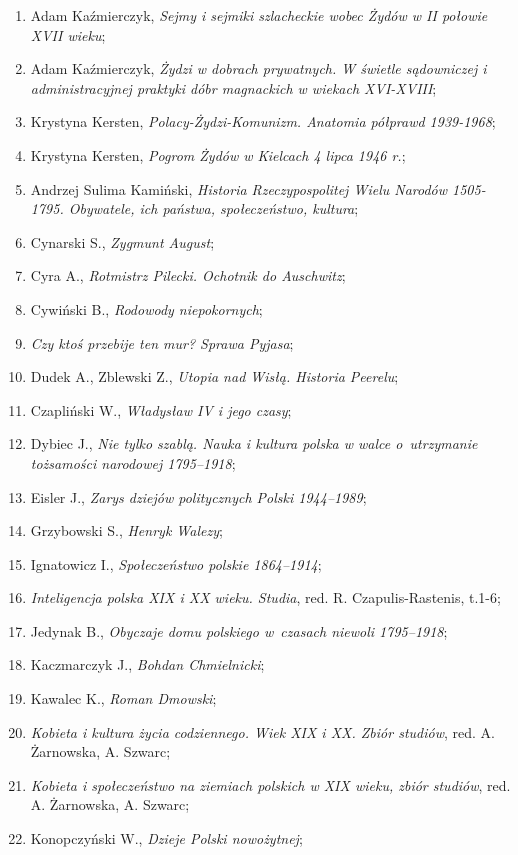 \documentclass[a4paper,11pt]{article}
\begin{document}
\begin{enumerate}
{    feudalnym w latach 1600-1643};
\item Adam Kaźmierczyk, \emph{Sejmy i sejmiki szlacheckie wobec Żydów
    w II połowie XVII wieku};
\item Adam Kaźmierczyk, \emph{Żydzi w dobrach prywatnych. W świetle
    sądowniczej i administracyjnej praktyki dóbr magnackich w wiekach
    XVI-XVIII};
\item Krystyna Kersten, \emph{Polacy-Żydzi-Komunizm. Anatomia półprawd
    1939-1968};
\item Krystyna Kersten, \emph{Pogrom Żydów w Kielcach 4 lipca 1946
    r.};
\item Andrzej Sulima Kamiński, \emph{Historia Rzeczypospolitej Wielu
    Narodów 1505-1795. Obywatele, ich państwa, społeczeństwo,
    kultura};
\item Cynarski S., \emph{Zygmunt August};
\item Cyra A., \emph{Rotmistrz Pilecki. Ochotnik do Auschwitz};
\item Cywiński B., \emph{Rodowody niepokornych};
\item \emph{Czy ktoś przebije ten mur? Sprawa Pyjasa};
\item Dudek A., Zblewski Z., \emph{Utopia nad Wisłą. Historia
    Peerelu};
\item Czapliński W., \emph{Władysław IV i jego czasy};
\item Dybiec J., \emph{Nie tylko szablą. Nauka i kultura polska w
    walce o~utrzymanie tożsamości narodowej 1795--1918};
\item Eisler J., \emph{Zarys dziejów politycznych Polski 1944--1989};
\item Grzybowski S., \emph{Henryk Walezy};
\item Ignatowicz I., \emph{Społeczeństwo polskie 1864--1914};
\item \emph{Inteligencja polska XIX i XX wieku. Studia}, red. R.
  Czapulis-Rastenis, t.1-6;
\item Jedynak B., \emph{Obyczaje domu polskiego w~czasach niewoli
    1795--1918};
\item Kaczmarczyk J., \emph{Bohdan Chmielnicki};
\item Kawalec K., \emph{Roman Dmowski};
\item \emph{Kobieta i kultura życia codziennego. Wiek XIX i XX. Zbiór
    studiów}, red. A. Żarnowska, A. Szwarc;
\item \emph{Kobieta i społeczeństwo na ziemiach polskich w XIX wieku,
    zbiór studiów}, red. A. Żarnowska, A. Szwarc;
\item Konopczyński W., \emph{Dzieje Polski nowożytnej};

\end{enumerate}
\end{document}
